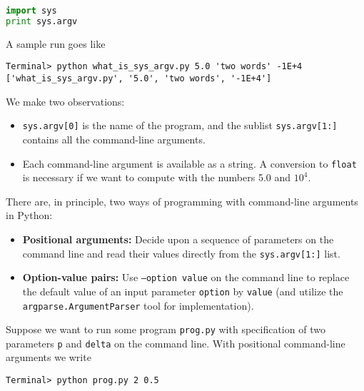 \documentclass[graybox,sectrefs,envcountresetchap,open=right,final]{svmonodo}
\begin{document}
\begin{lstlisting}[language=python,style=blue1bar_bluegreen]
import sys
print sys.argv

\end{lstlisting}

A sample run goes like




\begin{Verbatim}[frame=lines,label=\fbox{{\tiny Terminal}},framesep=2.5mm,framerule=0.7pt,fontsize=\fontsize{9pt}{9pt}]
Terminal> python what_is_sys_argv.py 5.0 'two words' -1E+4
['what_is_sys_argv.py', '5.0', 'two words', '-1E+4']

\end{Verbatim}

We make two observations:

\begin{itemize}
 \item \texttt{sys.argv[0]} is the name of the program, and the sublist \texttt{sys.argv[1:]} contains all the command-line arguments.

 \item Each command-line argument is available as a string. A conversion to \texttt{float} is necessary if we want to compute with the numbers 5.0 and $10^4$.
\end{itemize}

\noindent
There are, in principle, two ways of programming with
command-line arguments in Python:

\begin{itemize}
 \item \textbf{Positional arguments:} Decide upon a sequence of parameters on the command line and read their values directly from the \texttt{sys.argv[1:]} list.

 \item \textbf{Option-value pairs:}  Use \texttt{--option value} on the command line to replace the default value of an input parameter \texttt{option} by \texttt{value} (and utilize the \texttt{argparse.ArgumentParser} tool for implementation).
\end{itemize}

\noindent
Suppose we want to run some program \texttt{prog.py} with
specification of two parameters \texttt{p} and \texttt{delta} on the command line.
With positional command-line arguments we write



\begin{Verbatim}[frame=lines,label=\fbox{{\tiny Terminal}},framesep=2.5mm,framerule=0.7pt,fontsize=\fontsize{9pt}{9pt}]
Terminal> python prog.py 2 0.5

\end{Verbatim}
\end{document}
